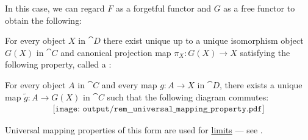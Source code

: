 \begin{remark}
  In this case, we can regard \( F \) as a forgetful functor and \( G \) as a free functor to obtain the following:
  \begin{displayquote}
    For every object \( X \) in \( \cat{D} \) there exist unique up to a unique isomorphism object \( G(X) \) in \( \cat{C} \) and canonical projection map \( \pi_X: G(X) \to X \) satisfying the following property, called a :
    \begin{displayquote}
      For every object \( A \) in \( \cat{C} \) and every map \( g: A \to X \) in \( \cat{D} \), there exists a unique map \( \widetilde{g}: A \to G(X) \) in \( \cat{C} \) such that the following diagram commutes:
      \begin{equation}\label{eq:rem:universal_mapping_property/d_triangle_forgetful}
        \begin{aligned}
          \texttt{[image: output/rem\_\_universal\_mapping\_property.pdf]}
        \end{aligned}
      \end{equation}
    \end{displayquote}
  \end{displayquote}

  Universal mapping properties of this form are used for \hyperref[def:category_of_cones/limit]{limits} --- see .
\end{remark}

